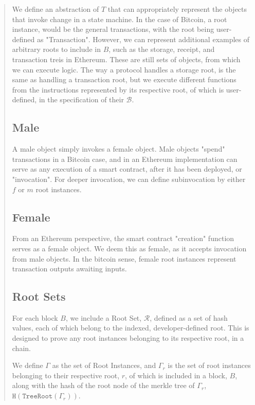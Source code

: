 \documentclass[12pt, titlepage, twocolumn]{report}
\begin{document}
\begin{quotation}
We define an abstraction of \(T\) that can appropriately represent the objects that invoke change in a state machine. In the case of Bitcoin, a root instance, would be the general transactions, with the root being user-defined as "Transaction". However, we can represent additional examples of arbitrary roots to include in \(B\), such as the storage, receipt, and transaction treis in Ethereum. These are still sets of objects, from which we can execute logic. The way a protocol handles a storage root, is the same as handling a transaction root, but we execute different functions from the instructions represented by its respective root, of which is user-defined, in the specification of their \(\boldsymbol{\mathcal{B}}\).


\subsection{Male}
A male object simply invokes a female object. Male objects "spend" transactions in a Bitcoin case, and in an Ethereum implementation can serve as any execution of a smart contract, after it has been deployed, or "invocation". For deeper invocation, we can define subinvocation by either \(f\) or \(m\) root instances.

\subsection{Female}
From an Ethereum perspective, the smart contract "creation" function serves as a female object. We deem this as female, as it accepts invocation from male objects. In the bitcoin sense, female root instances represent transaction outputs awaiting inputs. 


\subsection{Root Sets}


For each block \(B\),  we include a Root Set, \(\mathcal{R}\), defined as a set of hash values, each of which belong to the indexed, developer-defined root. This is designed to prove any root instances belonging to its respective root, in a chain.

We define \(\Gamma\) as the set of Root Instances, and \(\Gamma_r\) is the set of root instances belonging to their respective root, \(r\), of which is included in a block, \(B\), along with the hash of the root node of the merkle tree of \(\Gamma_r\), \(\boldsymbol{\texttt{H}}(\texttt{TreeRoot}({\Gamma_r}))\).


\end{quotation}
\end{document}
